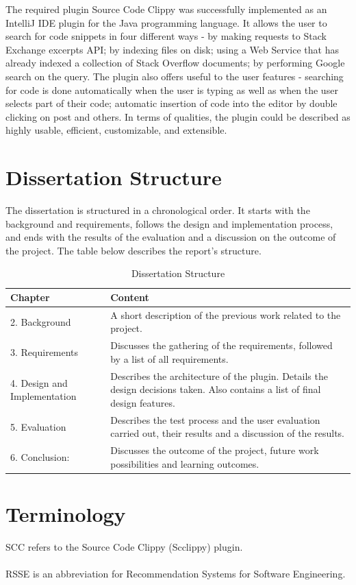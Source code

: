 \documentclass{l4proj}
\begin{document}
The required plugin Source Code Clippy was successfully implemented as an IntelliJ IDE plugin for the Java programming language. It allows the user to search for code snippets in four different ways - by making requests to Stack Exchange excerpts API; by indexing files on disk; using a Web Service that has already indexed a collection of Stack Overflow documents; by performing Google search on the query. The plugin also offers useful to the user features - searching for code is done automatically when the user is typing as well as when the user selects part of their code; automatic insertion of code into the editor by double clicking on post and others.  
In terms of qualities, the plugin could be described as highly usable, efficient, customizable, and extensible.

\section{Dissertation Structure}
The dissertation is structured in a chronological order. It starts with the background and requirements, follows the design and implementation process, and ends with the results of the evaluation and a discussion on the outcome of the project. The table below describes the report's structure.

\begin{table}[H]
\caption{Dissertation Structure}
\centering
\def\arraystretch{1.5}
\begin{tabular}{p{3cm}p{12cm}}
\hline
Chapter & Content \\
\hline
2. Background & A short description of the previous work related to the project. \\
3. Requirements & Discusses the gathering of the requirements, followed by a list of all requirements. \\
4. Design and Implementation & Describes the architecture of the plugin. Details the design decisions taken. Also contains a list of final design features.\\
5. Evaluation & Describes the test process and the user evaluation carried out, their results and a discussion of the results. \\
6. Conclusion: & Discusses the outcome of the project, future work possibilities and learning outcomes.  \\
\hline
\end{tabular}
\label{table:reportStructure}
\end{table}


\section{Terminology}
SCC refers to the Source Code Clippy (Scclippy) plugin.
\\
\\
RSSE is an abbreviation for Recommendation Systems for Software Engineering.
\end{document}
